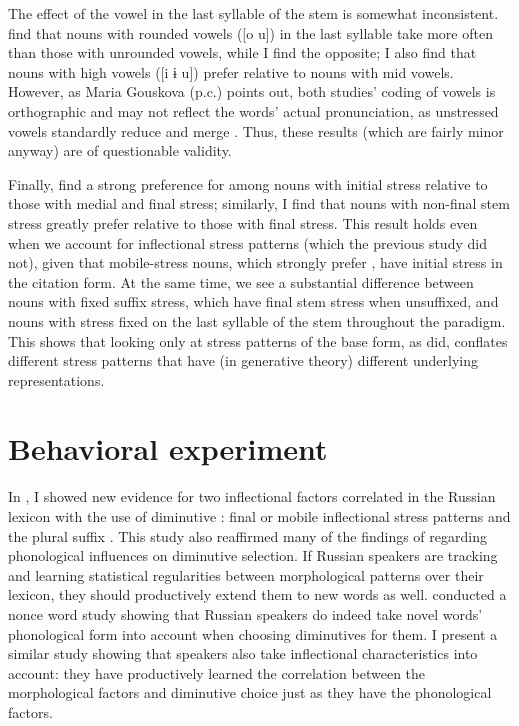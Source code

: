 \documentclass[output=paper,colorlinks,citecolor=brown
]{langscibook}
\begin{document}
The effect of the vowel in the last syllable of the stem is somewhat inconsistent. \citet{Gouskova.etal2015} find that nouns with rounded vowels ([o u]) in the last syllable take \ok{} more often than those with unrounded vowels, while I find the opposite; I also find that nouns with high vowels ([i ɨ u]) prefer \ok{} relative to nouns with mid vowels. However, as Maria Gouskova (p.c.) points out, both studies' coding of vowels is orthographic and may not reflect the words' actual pronunciation, as unstressed vowels standardly reduce and merge \citep{Yanushevskaya.Buncic2015}. %
Thus, these results (which are fairly minor anyway) are of questionable validity.

Finally, \citet{Gouskova.etal2015} find a strong preference for \ok{} among nouns with initial stress relative to those with medial and final stress; similarly, I find that nouns with non-final stem stress greatly prefer \ok{} relative to those with final stress. This result holds even when we account for inflectional stress patterns (which the previous study did not), given that mobile-stress nouns, which strongly prefer \ok, have initial stress in the citation form. At the same time, we see a substantial difference between nouns with fixed suffix stress, which have final stem stress when unsuffixed, and nouns with stress fixed on the last syllable of the stem throughout the paradigm. %
This shows that looking only at stress patterns of the base form, as \citet{Gouskova.etal2015} did, conflates different stress patterns that have (in generative theory) different underlying representations.

\section{Behavioral experiment}\label{sec:exp}
In , I showed new evidence for two inflectional factors correlated in the Russian lexicon with the use of diminutive \ok: final or mobile inflectional stress patterns and the plural suffix \pla. This study also reaffirmed many of the findings of \citet{Gouskova.etal2015} regarding phonological influences on diminutive selection. If Russian speakers are tracking and learning statistical regularities between morphological patterns over their lexicon, they should productively extend them to new words as well. \citet{Gouskova.etal2015} conducted a nonce word study showing that Russian speakers do indeed take novel words' phonological form into account when choosing diminutives for them. I present a similar study showing that speakers also take inflectional characteristics into account: they have productively learned the correlation between the morphological factors and diminutive choice just as they have the phonological factors.
\end{document}

